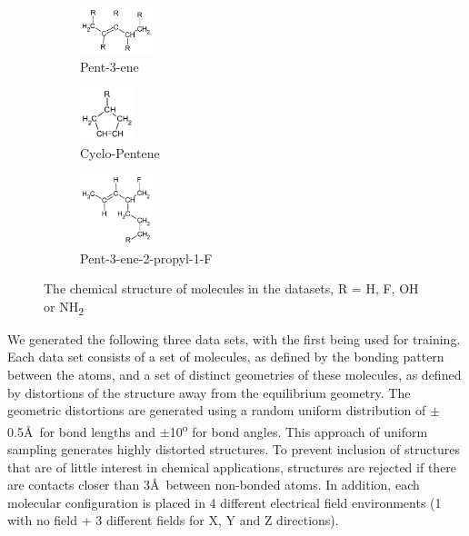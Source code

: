 \documentclass[twoside,11pt]{article}
\begin{document}
\begin{figure}[h!]
\centering
\begin{subfigure}{.3\textwidth}
  \centering
  \includegraphics[width=80px]{pent3ene.pdf}
  \caption{Pent-3-ene}
  \label{fig:pent3ene}
\end{subfigure}%
\begin{subfigure}{.3\textwidth}
  \centering
  \includegraphics[width=60px]{RcycloPenteneHs.pdf}
  \caption{Cyclo-Pentene}
  \label{fig:cycloPen}
\end{subfigure}
\begin{subfigure}{.3\textwidth}
  \centering
  \includegraphics[width=80px]{pent3ene2propNOF.pdf}
  \caption{Pent-3-ene-2-propyl-1-F}
  \label{fig:propSub}
\end{subfigure}
\caption{The chemical structure of molecules in the datasets, R = H, F, OH or NH\textsubscript{2}}
\label{fig:Molecules}
\end{figure}
We generated the following three data sets, with the first being used for training. Each data set consists of a set of molecules, as defined by the bonding pattern between the atoms, and a set of distinct geometries of these molecules, as defined by distortions of the structure away from the equilibrium geometry. The geometric distortions are generated using a random uniform distribution of $\pm$0.5\AA\ for bond lengths and $\pm$10\textsuperscript{o} for bond angles.  This approach of uniform sampling generates highly distorted structures. To prevent inclusion of structures that are of little interest in chemical applications, structures are rejected if there are contacts closer than 3\AA\ between non-bonded atoms.  In addition, each molecular configuration is placed in 4 different electrical field environments (1 with no field + 3 different fields for X, Y and Z directions).
\end{document}
